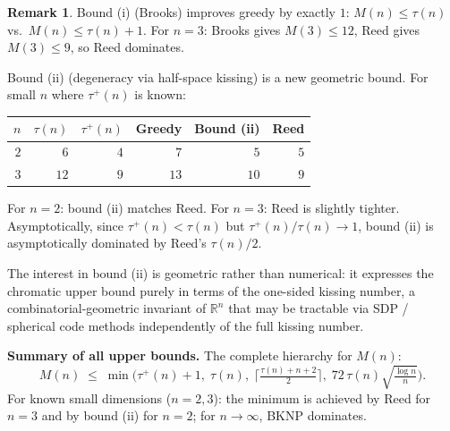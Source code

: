 \documentclass{article}
\theoremstyle{definition}
\newtheorem{remark}[theorem]{Remark}
\begin{document}
\begin{remark}
Bound (i) (Brooks) improves greedy by exactly $1$: $M(n)\le\tau(n)$ vs.\ $M(n)\le\tau(n)+1$.  For $n=3$: Brooks gives $M(3)\le 12$, Reed gives $M(3)\le 9$, so Reed dominates.

Bound (ii) (degeneracy via half-space kissing) is a new geometric bound.  For small $n$ where $\tau^+(n)$ is known:
\smallskip
\begin{center}
\begin{tabular}{r|r|r|r|r|r}
$n$ & $\tau(n)$ & $\tau^+(n)$ & Greedy & \textup{Bound (ii)} & Reed \\
\hline
$2$ & $6$ & $4$ & $7$ & $5$ & $5$ \\
$3$ & $12$ & $9$ & $13$ & $10$ & $9$ \\
\end{tabular}
\end{center}
\smallskip
For $n=2$: bound (ii) matches Reed.  For $n=3$: Reed is slightly tighter.  Asymptotically, since $\tau^+(n)<\tau(n)$ but $\tau^+(n)/\tau(n)\to 1$, bound (ii) is asymptotically dominated by Reed's $\tau(n)/2$.

The interest in bound (ii) is geometric rather than numerical: it expresses the chromatic upper bound purely in terms of the one-sided kissing number, a combinatorial-geometric invariant of $\mathbb{R}^n$ that may be tractable via SDP / spherical code methods independently of the full kissing number.
\end{remark}

\medskip
\textbf{Summary of all upper bounds.}  The complete hierarchy for $M(n)$:
\[
  M(n)\;\le\;\min\bigl(\tau^+(n)+1,\;\tau(n),\;\lceil\tfrac{\tau(n)+n+2}{2}\rceil,\;72\,\tau(n)\sqrt{\tfrac{\log n}{n}}\bigr).
\]
For known small dimensions ($n=2,3$): the minimum is achieved by Reed for $n=3$ and by bound (ii) for $n=2$; for $n\to\infty$, BKNP dominates.
\end{document}
